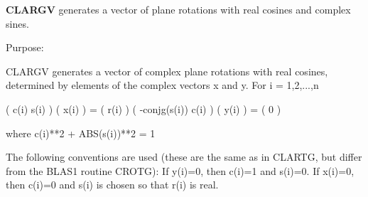 {\bfseries C\+L\+A\+R\+G\+V} generates a vector of plane rotations with real cosines and complex sines. 

 \begin{DoxyParagraph}{Purpose\+: }
\begin{DoxyVerb} CLARGV generates a vector of complex plane rotations with real
 cosines, determined by elements of the complex vectors x and y.
 For i = 1,2,...,n

    (        c(i)   s(i) ) ( x(i) ) = ( r(i) )
    ( -conjg(s(i))  c(i) ) ( y(i) ) = (   0  )

    where c(i)**2 + ABS(s(i))**2 = 1

 The following conventions are used (these are the same as in CLARTG,
 but differ from the BLAS1 routine CROTG):
    If y(i)=0, then c(i)=1 and s(i)=0.
    If x(i)=0, then c(i)=0 and s(i) is chosen so that r(i) is real.\end{DoxyVerb}
 
\end{DoxyParagraph}

